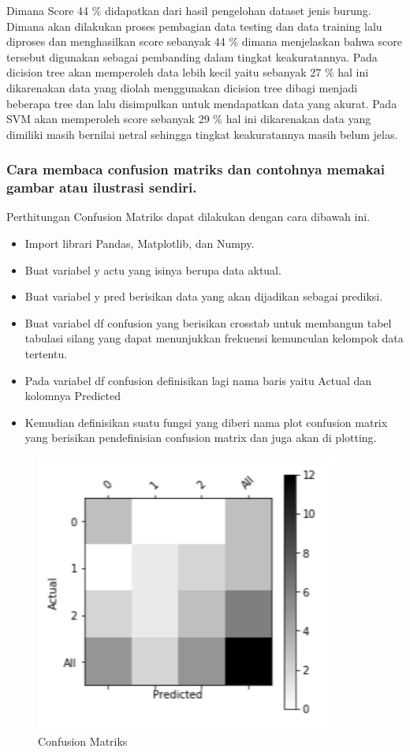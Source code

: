 \hfill\break
Dimana Score 44 \% didapatkan dari hasil pengelohan dataset jenis burung. Dimana akan dilakukan proses pembagian data testing dan data training lalu diproses dan menghasilkan score sebanyak 44 \% dimana menjelaskan bahwa score tersebut digunakan sebagai pembanding dalam tingkat keakuratannya. Pada dicision tree akan memperoleh data lebih kecil yaitu sebanyak 27 \% hal ini dikarenakan data yang diolah menggunakan dicision tree dibagi menjadi beberapa tree dan lalu disimpulkan untuk mendapatkan data yang akurat. Pada SVM akan memperoleh score sebanyak 29 \% hal ini dikarenakan data yang dimiliki masih bernilai netral sehingga tingkat keakuratannya masih belum jelas.

\subsubsection{Cara membaca confusion matriks dan contohnya memakai gambar atau ilustrasi sendiri.}

\hfill\break
Perthitungan Confusion Matriks dapat dilakukan dengan cara dibawah ini.
\begin{itemize}
\item
Import librari Pandas, Matplotlib, dan Numpy.
\item
Buat variabel y actu yang isinya berupa data aktual.
\item
Buat variabel y pred berisikan data yang akan dijadikan sebagai prediksi.
\item
Buat variabel df confusion yang berisikan crosstab untuk membangun tabel tabulasi silang yang dapat menunjukkan frekuensi kemunculan kelompok data tertentu.
\item
Pada variabel df confusion definisikan lagi nama baris yaitu Actual dan kolomnya Predicted
\item
Kemudian definisikan suatu fungsi yang diberi nama plot confusion matrix yang berisikan pendefinisian confusion matrix dan juga akan di plotting.

\end{itemize}
\begin{figure}[H]
\centerline{\includegraphics[width=10cm]{figures/1174084/3/2.png}}
\caption{Confusion Matriks}
\label{labelgambar}
\end{figure}

